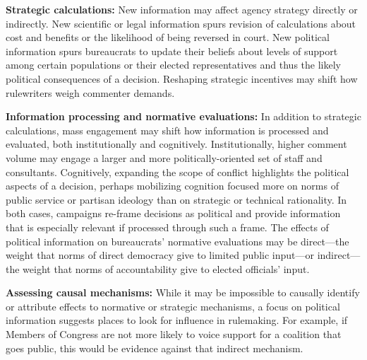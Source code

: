 \textbf{Strategic calculations:} 
New information may affect agency strategy directly or indirectly. New scientific or legal information spurs revision of calculations about cost and benefits or the likelihood of being reversed in court. New political information spurs bureaucrats to update their beliefs about levels of support among certain populations or their elected representatives and thus the likely political consequences of a decision.
Reshaping strategic incentives may shift how rulewriters weigh commenter demands.

\textbf{Information processing and normative evaluations:} 
In addition to strategic calculations, mass engagement may shift how information is processed and evaluated, both institutionally and cognitively.
Institutionally, higher comment volume may engage a larger and more politically-oriented set of staff and consultants. Cognitively, expanding the scope of conflict highlights the political aspects of a decision, perhaps mobilizing cognition focused more on norms of public service or partisan ideology than on strategic or technical rationality. In both cases, campaigns re-frame decisions as political and provide information that is especially relevant if processed through such a frame.
The effects of political information on bureaucrats' normative evaluations may be
direct---the weight that norms of direct democracy give to limited public input---or 
indirect---the weight that norms of accountability give to elected officials' input.


\textbf{Assessing causal mechanisms:} While it may be impossible to causally identify or attribute effects to normative or strategic mechanisms, 
a focus on political information suggests places to look for influence in rulemaking. For example, if Members of Congress are not more likely to voice support for a coalition that goes public, this would be evidence against that indirect mechanism.

